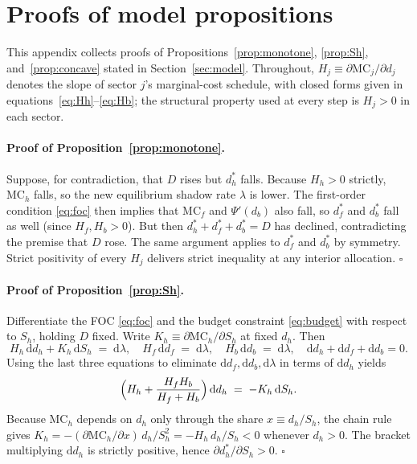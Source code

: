 \documentclass[\latexroot/\projectname]{subfiles}
\begin{document}
\appendix

\section{Proofs of model propositions}
\whenintegrated{\label{app:proofs}}

This appendix collects proofs of Propositions~\ref{prop:monotone},
\ref{prop:Sh}, and~\ref{prop:concave} stated in
Section~\ref{sec:model}. Throughout, $H_j\equiv\partial\text{MC}_j/\partial d_j$
denotes the slope of sector $j$'s marginal-cost schedule, with closed
forms given in equations~\eqref{eq:Hh}--\eqref{eq:Hb}; the structural
property used at every step is $H_j>0$ in each sector.

\paragraph{Proof of Proposition~\ref{prop:monotone}.}
Suppose, for contradiction, that $D$ rises but $d_h^\ast$ falls.
Because $H_h>0$ strictly, $\text{MC}_h$ falls, so the new equilibrium
shadow rate $\lambda$ is lower. The first-order condition
\eqref{eq:foc} then implies that $\text{MC}_f$ and $\Psi'(d_b)$ also
fall, so $d_f^\ast$ and $d_b^\ast$ fall as well (since $H_f,H_b>0$).
But then $d_h^\ast+d_f^\ast+d_b^\ast=D$ has declined, contradicting
the premise that $D$ rose. The same argument applies to $d_f^\ast$
and $d_b^\ast$ by symmetry. Strict positivity of every $H_j$
delivers strict inequality at any interior allocation. $\square$

\paragraph{Proof of Proposition~\ref{prop:Sh}.}
Differentiate the FOC \eqref{eq:foc} and the budget constraint
\eqref{eq:budget} with respect to $S_h$, holding $D$ fixed. Write
$K_h\equiv\partial\text{MC}_h/\partial S_h$ at fixed $d_h$. Then
\[
  H_h\,\mathrm{d}d_h + K_h\,\mathrm{d}S_h \;=\; \mathrm{d}\lambda,
  \quad
  H_f\,\mathrm{d}d_f \;=\; \mathrm{d}\lambda,
  \quad
  H_b\,\mathrm{d}d_b \;=\; \mathrm{d}\lambda,
  \quad
  \mathrm{d}d_h+\mathrm{d}d_f+\mathrm{d}d_b=0.
\]
Using the last three equations to eliminate $\mathrm{d}d_f,
\mathrm{d}d_b,\mathrm{d}\lambda$ in terms of $\mathrm{d}d_h$ yields
\[
  \Bigl(H_h+\frac{H_fH_b}{H_f+H_b}\Bigr)\,\mathrm{d}d_h
  \;=\;-K_h\,\mathrm{d}S_h.
\]
Because $\text{MC}_h$ depends on $d_h$ only through the share
$x\equiv d_h/S_h$, the chain rule gives
$K_h=-(\partial\text{MC}_h/\partial x)\,d_h/S_h^{2}=-H_h\,d_h/S_h<0$
whenever $d_h>0$. The bracket multiplying $\mathrm{d}d_h$ is strictly
positive, hence $\partial d_h^\ast/\partial S_h>0$. $\square$
\end{document}
